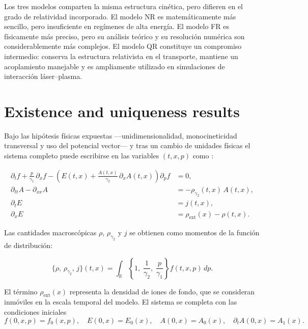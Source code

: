 \documentclass[11pt,a4paper,twoside,pdf]{article}
\numberwithin{equation}{section}
\begin{document}
Los tres modelos comparten la misma estructura cinética, pero difieren en el grado
de relatividad incorporado. El modelo NR es matemáticamente más sencillo, pero
insuficiente en regímenes de alta energía. El modelo FR es físicamente más preciso,
pero su análisis teórico y su resolución numérica son considerablemente más
complejos. El modelo QR constituye un compromiso intermedio: conserva la
estructura relativista en el transporte, mantiene un acoplamiento manejable y es
ampliamente utilizado en simulaciones de interacción láser–plasma.














\section{Existence and uniqueness results}

Bajo las hipótesis físicas expuestas —unidimensionalidad,
monocineticidad transversal y uso del potencial vector— y tras un cambio de unidades físicas el sistema completo puede
escribirse en las variables $(t,x,p)$ como \cite{carrillo2006global}:

\begin{align}
\partial_t f
+ \frac{p}{\gamma_1}\,\partial_x f
- \left( E(t,x)
+ \frac{A(t,x)}{\gamma_2}\,\partial_x A(t,x) \right)\partial_p f &= 0, \label{eq:RM1}\\[0.4em]
\partial_{tt} A - \partial_{xx} A &= - \rho_{\gamma_2}(t,x)\,A(t,x), \label{eq:RM2}\\[0.4em]
\partial_t E &= j(t,x), \label{eq:RM3}\\[0.4em]
\partial_x E &= \rho_{\mathrm{ext}}(x) - \rho(t,x). \label{eq:RM4}
\end{align}

Las cantidades macroscópicas $\rho$, $\rho_{\gamma_2}$ y $j$ se obtienen como momentos
de la función de distribución:


\[
\{\rho,\,\rho_{\gamma_2},\,j\}(t,x)
= \int_{\mathbb{R}} \left\{ 1,\;\frac{1}{\gamma_2},\;\frac{p}{\gamma_1} \right\} f(t,x,p)\,dp.
\]






El término $\rho_{\mathrm{ext}}(x)$ representa la densidad de iones de fondo, que se
consideran inmóviles en la escala temporal del modelo. El sistema se completa con
las condiciones iniciales
\begin{equation}
f(0,x,p)=f_0(x,p), \quad
E(0,x)=E_0(x), \quad
A(0,x)=A_0(x), \quad
\partial_t A(0,x)=A_1(x).
\label{eq:IC}
\end{equation}
\end{document}
